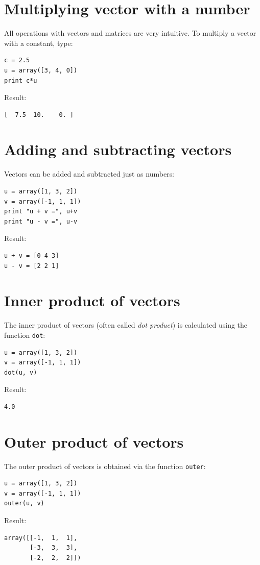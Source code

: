 \documentclass[article,A4,12pt]{llncs}
\begin{document}
\section{Multiplying vector with a number}

All operations with vectors and matrices are very intuitive. To multiply 
a vector with a constant, type:

\begin{verbatim}
c = 2.5
u = array([3, 4, 0])
print c*u
\end{verbatim}
Result:
\begin{verbatim}
[  7.5  10.    0. ]
\end{verbatim}

\section{Adding and subtracting vectors}

Vectors can be added and subtracted just as numbers:

\begin{verbatim}
u = array([1, 3, 2])
v = array([-1, 1, 1])
print "u + v =", u+v
print "u - v =", u-v
\end{verbatim}
Result:
\begin{verbatim}
u + v = [0 4 3]
u - v = [2 2 1]
\end{verbatim}

\section{Inner product of vectors}

The inner product of vectors (often called {\em dot product}) is calculated
using the function {\tt dot}:

\begin{verbatim}
u = array([1, 3, 2])
v = array([-1, 1, 1])
dot(u, v)
\end{verbatim}
Result:
\begin{verbatim}
4.0
\end{verbatim}

\section{Outer product of vectors}

The outer product of vectors is obtained via the function {\tt outer}:
\begin{verbatim}
u = array([1, 3, 2])
v = array([-1, 1, 1])
outer(u, v)
\end{verbatim}
Result:
\begin{verbatim}
array([[-1,  1,  1],
       [-3,  3,  3],
       [-2,  2,  2]])
\end{verbatim}
\end{document}
